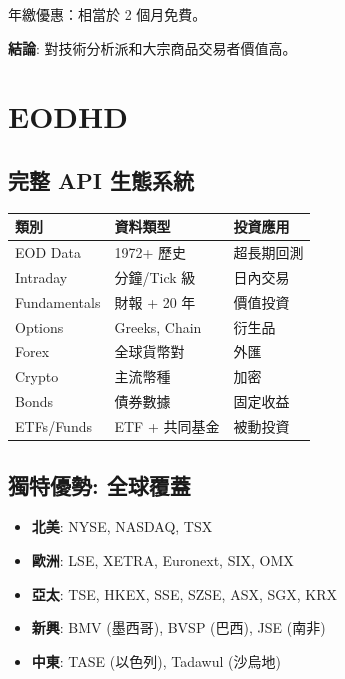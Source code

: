 \documentclass[11pt,a4paper]{article}
\begin{document}
年繳優惠：相當於 2 個月免費。

\textbf{結論}: 對技術分析派和大宗商品交易者價值高。

\newpage
\section{EODHD}

\subsection{完整 API 生態系統}

\begin{table}[H]
\centering
\begin{tabular}{@{}lll@{}}
\toprule
\textbf{類別} & \textbf{資料類型} & \textbf{投資應用} \\
\midrule
EOD Data & 1972+ 歷史 & 超長期回測 \\
Intraday & 分鐘/Tick 級 & 日內交易 \\
Fundamentals & 財報 + 20 年 & 價值投資 \\
Options & Greeks, Chain & 衍生品 \\
Forex & 全球貨幣對 & 外匯 \\
Crypto & 主流幣種 & 加密 \\
Bonds & 債券數據 & 固定收益 \\
ETFs/Funds & ETF + 共同基金 & 被動投資 \\
\bottomrule
\end{tabular}
\end{table}

\subsection{獨特優勢: 全球覆蓋}

\begin{tcolorbox}[colback=eohdorange!5,colframe=eohdorange,title={60+ 交易所 (其他少有的廣度)}]
\begin{itemize}[leftmargin=*]
    \item \textbf{北美}: NYSE, NASDAQ, TSX
    \item \textbf{歐洲}: LSE, XETRA, Euronext, SIX, OMX
    \item \textbf{亞太}: TSE, HKEX, SSE, SZSE, ASX, SGX, KRX
    \item \textbf{新興}: BMV (墨西哥), BVSP (巴西), JSE (南非)
    \item \textbf{中東}: TASE (以色列), Tadawul (沙烏地)
\end{itemize}
\end{tcolorbox}
\end{document}
